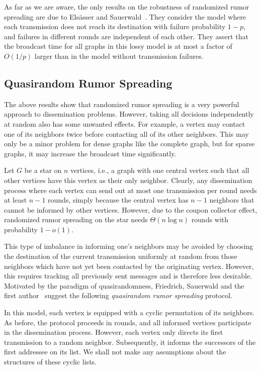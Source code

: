 \documentclass[12pt]{article}
\begin{document}
{ 
    As far as we are aware, the only results on the robustness of randomized rumor spreading are due to Els\"asser and Sauerwald~\cite{ES06full}. They consider the model where each transmission does not reach its destination with failure probability $1-p$, and failures in different rounds are independent of each other. They assert that the broadcast time for all graphs in this lossy model is at most a factor of $O(1/p)$ larger than in the model without transmission failures.
    
\subsection{Quasirandom Rumor Spreading}

  The above results show that randomized rumor spreading is a very powerful approach to dissemination problems. However, taking all decisions independently at random also has some unwanted effects. For example, a vertex may contact one of its neighbors twice before contacting all of its other neighbors. This may only be a minor problem for dense graphs like the complete graph, but for sparse graphs, it may increase the broadcast time significantly. 
  
  Let $G$ be a star on $n$ vertices, i.e., a graph with one central vertex such that all other vertices have this vertex as their only neighbor. Clearly, any dissemination process where each vertex can send out at most one transmission per round needs at least $n-1$ rounds, simply because the central vertex has $n-1$ neighbors that cannot be informed by other vertices. However, due to the coupon collector effect, randomized rumor spreading on the star needs $\Theta(n \log n)$ rounds with probability $1 - o(1)$. 
  
  This type of imbalance in informing one's neighbors may be avoided by choosing the destination of the current transmission uniformly at random from those neighbors which have not yet been contacted by the originating vertex. However, this requires tracking all previously sent messages and is therefore less desirable. Motivated by the paradigm of quasirandomness, Friedrich, Sauerwald and the first author~\cite{DFS08} suggest the following \emph{quasirandom rumor spreading} protocol.
  
  In this model, each vertex is equipped with a cyclic permutation of its neighbors. As before, the protocol proceeds in rounds, and all informed vertices participate in the dissemination process. However, each vertex only directs its first transmission to a random neighbor. Subsequently, it informs the successors of the first addressee on its list. We shall not make any assumptions about the structures of these cyclic lists.

}
\end{document}

